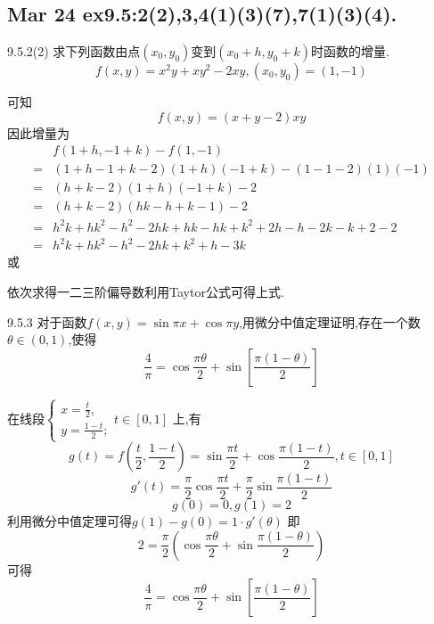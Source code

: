 \setcounter{chapter}{4} %
\chapter{}

\section{Mar 24 ex9.5:2(2),3,4(1)(3)(7),7(1)(3)(4).}

\begin{exercise}{9.5.2(2)}
    求下列函数由点$(x_0,y_0)$变到$(x_0+h,y_0+k)$时函数的增量.
    $$f(x,y)=x^2y+xy^2-2xy,(x_0,y_0)=(1,-1)$$
\end{exercise}
\begin{solution}
    可知$$f(x,y)=(x+y-2)xy$$因此增量为
    \begin{align*}
        &f(1+h,-1+k)-f(1,-1)\\
        =&(1+h-1+k-2)(1+h)(-1+k)-(1-1-2)(1)(-1)\\
        =&(h+k-2)(1+h)(-1+k)-2\\
        =&(h+k-2)(hk-h+k-1)-2\\
        =&h^2k+hk^2-h^2-2hk+hk-hk+k^2+2h-h-2k-k+2-2\\
        =&h^2k+hk^2-h^2-2hk+k^2+h-3k
    \end{align*}
    或

    依次求得一二三阶偏导数利用Taytor公式可得上式.
\end{solution}

\begin{exercise}{9.5.3}
    对于函数$f(x,y)=\sin \pi x+\cos\pi y$,用微分中值定理证明,存在一个数$\theta\in(0,1)$,使得
    $$\frac{4}{\pi}=\cos\frac{\pi\theta}{2}+\sin[\frac{\pi(1-\theta)}{2}]$$
\end{exercise}
\begin{solution}
    在线段$\begin{cases}
        x=\frac{t}{2},\\
        y=\frac{1-t}{2};
    \end{cases}t\in[0,1]$
    上,有$$g(t)=f(\frac{t}{2},\frac{1-t}{2})=\sin \frac{\pi t}{2}+\cos\frac{\pi(1-t)}{2},t\in[0,1]$$
    $$g'(t)=\frac{\pi}{2}\cos\frac{\pi t}{2}+\frac{\pi}{2}\sin\frac{\pi(1-t)}{2}$$
    $$g(0)=0,g(1)=2$$
    利用微分中值定理可得$g(1)-g(0)=1\cdot g'(\theta)$
    即$$2=\frac{\pi}{2}\left(\cos\frac{\pi \theta}{2}+\sin\frac{\pi(1-\theta)}{2}\right)$$
    可得
    $$\frac{4}{\pi}=\cos\frac{\pi\theta}{2}+\sin[\frac{\pi(1-\theta)}{2}]$$
\end{solution}




